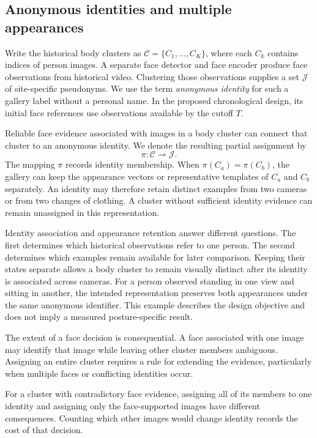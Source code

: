 \documentclass[journal,letterpaper]{IEEEtran}
\newcommand{\draftnote}[3]{\par\smallskip\noindent{\footnotesize
  \textcolor{editink}{\sffamily\bfseries [#2 #1]}\enspace
  \textcolor{editink}{#3}\par}\smallskip}
\newcommand{\methodgap}[2]{\draftnote{METHOD}{#1}{#2}}
\begin{document}
\subsection{Anonymous identities and multiple appearances}
Write the historical body clusters as $\mathcal C=\{C_1,\ldots,C_K\}$, where each $C_k$ contains indices of person images. A separate face detector and face encoder produce face observations from historical video. Clustering those observations supplies a set $\mathcal J$ of site-specific pseudonyms. We use the term \emph{anonymous identity} for such a gallery label without a personal name. In the proposed chronological design, its initial face references use observations available by the cutoff $T$.

Reliable face evidence associated with images in a body cluster can connect that cluster to an anonymous identity. We denote the resulting partial assignment by
\begin{equation}
 \pi:\mathcal C\rightharpoonup\mathcal J.
 \label{eq:assignment}
\end{equation}
The mapping $\pi$ records identity membership. When $\pi(C_a)=\pi(C_b)$, the gallery can keep the appearance vectors or representative templates of $C_a$ and $C_b$ separately. An identity may therefore retain distinct examples from two cameras or from two changes of clothing. A cluster without sufficient identity evidence can remain unassigned in this representation.

Identity association and appearance retention answer different questions. The first determines which historical observations refer to one person. The second determines which examples remain available for later comparison. Keeping their states separate allows a body cluster to remain visually distinct after its identity is associated across cameras. For a person observed standing in one view and sitting in another, the intended representation preserves both appearances under the same anonymous identifier. This example describes the design objective and does not imply a measured posture-specific result.

The extent of a face decision is consequential. A face associated with one image may identify that image while leaving other cluster members ambiguous. Assigning an entire cluster requires a rule for extending the evidence, particularly when multiple faces or conflicting identities occur.
\methodgap{M2}{Specify face-to-body pairing, face clustering and confidence thresholds, reference enrollment times, cluster-wide propagation criteria, and the treatment of conflicting face identities.}
For a cluster with contradictory face evidence, assigning all of its members to one identity and assigning only the face-supported images have different consequences. Counting which other images would change identity records the cost of that decision.
\end{document}
